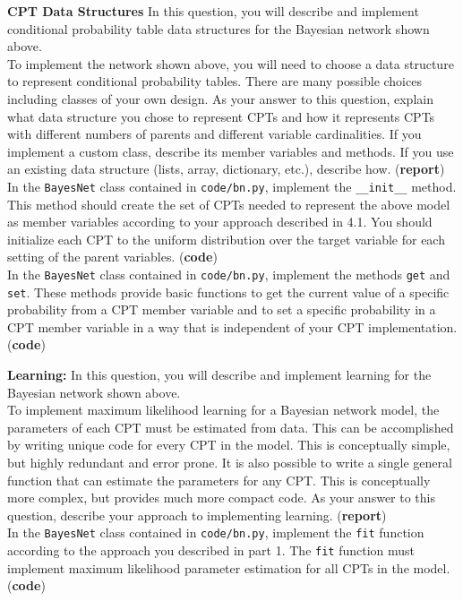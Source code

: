 \documentclass[11pt]{article}
\begin{document}
\begin{problem}{15} \textbf{CPT Data Structures} In this question, you will describe and implement conditional probability table data structures for the Bayesian network shown above.\\
	
 To implement the network shown above, you will need to choose a data structure to represent  conditional probability tables. There are many possible choices including classes of your own design. As your answer to this question, explain what data structure you chose to represent CPTs and how it represents CPTs with different numbers of parents and different variable cardinalities. If you implement a custom class, describe its member variables and methods. If you use an existing data structure (lists, array, dictionary, etc.), describe how. (\textbf{report}) \\

  In the \verb|BayesNet| class contained in \verb|code/bn.py|, implement the \verb|__init__| method. This method should create the set of CPTs needed to represent the above model as member variables according to your approach described in 4.1. You should initialize each CPT to the uniform distribution over the target variable for each setting of the parent variables. (\textbf{code}) \\

 In the \verb|BayesNet| class contained in \verb|code/bn.py|, implement the methods \verb|get| and \verb|set|. These methods provide basic functions to get the current value of a specific probability from a CPT member variable and to set a specific probability in a CPT member variable in a way that is independent of your CPT implementation. (\textbf{code}) 


\end{problem}


\begin{problem}{15} \textbf{Learning:} In this question, you will describe and implement learning for the Bayesian network shown above.\\
	
 To implement maximum likelihood learning for a Bayesian network model, the parameters of each CPT must be estimated from data. This can be accomplished by writing unique code for every CPT in the model. This is conceptually simple, but highly redundant and error prone. It is also possible to write a single general function that can estimate the parameters for any CPT. This is conceptually more complex, but provides much more compact code. As your answer to this question, describe your approach to implementing learning. (\textbf{report})\\

 In the \verb|BayesNet| class contained in \verb|code/bn.py|, implement the \verb|fit| function according to the approach you described in part 1. The \verb|fit| function must implement maximum likelihood parameter estimation for all CPTs in the model. (\textbf{code})

\end{problem}
\end{document}
